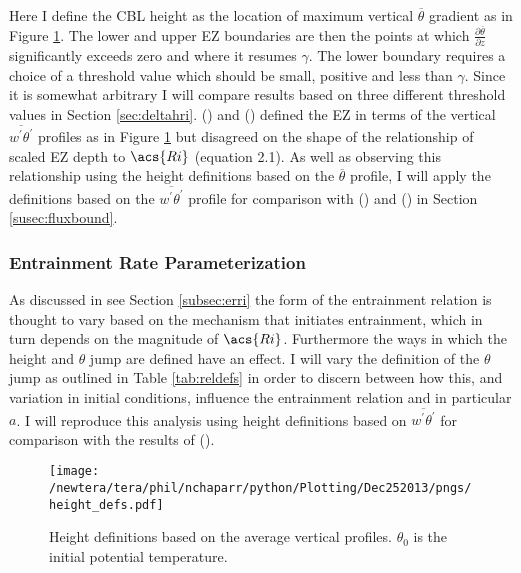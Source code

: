 Here I define the \acs{CBL} height as the location of maximum vertical $\overline{\theta}$ gradient as in Figure \ref{fig:hdefs}.  The lower and upper \acs{EZ} boundaries are then the points at which $\frac{\partial \overline{\theta}}{\partial z}$ significantly exceeds zero and where it resumes $\gamma$.  The lower boundary requires a choice of a threshold value which should be small, positive and less than $\gamma$. Since it is somewhat arbitrary I will compare results based on three different threshold values in Section \ref{sec:deltahri}.  \citeauthor{FedConzMir04} (\citeyear{FedConzMir04}) and \citeauthor{BrooksFowler2} (\citeyear{BrooksFowler2}) defined the \acs{EZ} in terms of the vertical $\overline{w^{'}\theta^{'}}$ profiles as in Figure \ref{fig:hdefs} but disagreed on the shape of the relationship of scaled \acs{EZ} depth to $\acs{Ri}$ (equation 2.1).  As well as observing this relationship using the height definitions based on the $\overline{\theta}$ profile, I will apply the definitions based on the $\overline{w^{'}\theta^{'}}$ profile for comparison with \citeauthor{BrooksFowler2} (\citeyear{BrooksFowler2}) and \citeauthor{FedConzMir04} (\citeyear{FedConzMir04}) in Section \ref{susec:fluxbound}.\\  

\subsubsection{Entrainment Rate Parameterization}
As discussed in see Section \ref{subsec:erri} the form of the entrainment relation is thought to vary based on the mechanism that initiates entrainment, which in turn depends on the magnitude of $\acs{Ri}$.  Furthermore the ways in which the height and $\theta$ jump are defined have an effect. I will vary the definition of the $\theta$ jump as outlined in Table \ref{tab:reldefs} in order to discern between how this, and variation in initial conditions, influence the entrainment relation and in particular $a$. I will reproduce this analysis using height definitions based on $\overline{w^{'}\theta^{'}}$ for comparison with the results of \citeauthor{FedConzMir04} (\citeyear{FedConzMir04}).

\begin{figure}[htbp]
    \centering
    \texttt{[image: /newtera/tera/phil/nchaparr/python/Plotting/Dec252013/pngs/height\_defs.pdf]}
    \caption[Height Definitions]{Height definitions based on the average vertical profiles. $\theta_{0}$ is the initial potential temperature.}
    \label{fig:hdefs}   %
\end{figure}


